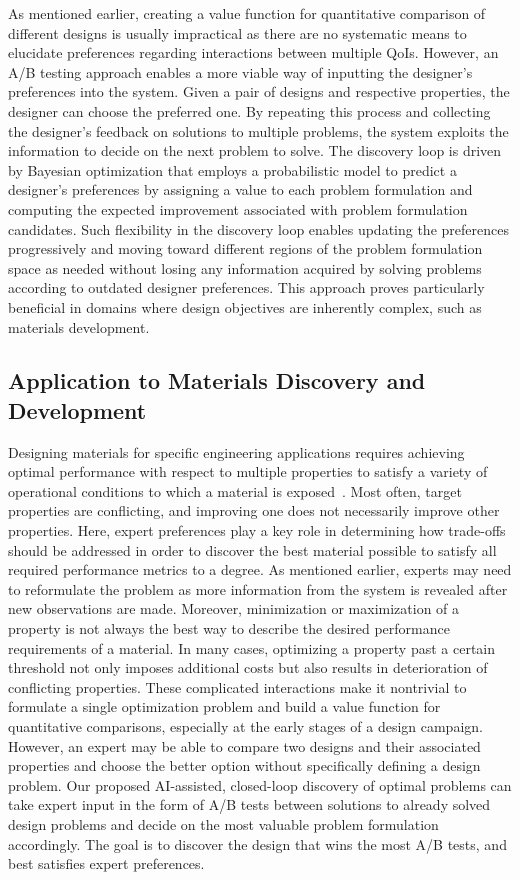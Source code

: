 \documentclass[final,5p,times,twocolumn]{elsarticle}
\begin{document}
As mentioned earlier, creating a value function for quantitative comparison of different designs is usually impractical as there are no systematic means to elucidate preferences regarding interactions between multiple QoIs. However, an A/B testing approach enables a more viable way of inputting the designer's preferences into the system. Given a pair of designs and respective properties, the designer can choose the preferred one. By repeating this process and collecting the designer's feedback on solutions to multiple problems, the system exploits the information to decide on the next problem to solve. The discovery loop is driven by Bayesian optimization that employs a probabilistic model to predict a designer's preferences by assigning a value to each problem formulation and computing the expected improvement associated with problem formulation candidates. Such flexibility in the discovery loop enables updating the preferences progressively and moving toward different regions of the problem formulation space as needed without losing any information acquired by solving problems according to outdated designer preferences. This approach proves particularly beneficial in domains where design objectives are inherently complex, such as materials development.



\subsection{Application to Materials Discovery and Development}


Designing materials for specific engineering applications requires achieving optimal performance with respect to multiple properties to satisfy a variety of operational conditions to which a material is exposed~\cite{Arroyave2022ADesign}. Most often, target properties are conflicting, and improving one does not necessarily improve other properties. Here, expert preferences play a key role in determining how trade-offs should be addressed in order to discover the best material possible to satisfy all required performance metrics to a degree. As mentioned earlier, experts may need to reformulate the problem as more information from the system is revealed after new observations are made. Moreover, minimization or maximization of a property is not always the best way to describe the desired performance requirements of a material. In many cases, optimizing a property past a certain threshold not only imposes additional costs but also results in deterioration of conflicting properties. These complicated interactions make it nontrivial to formulate a single optimization problem and build a value function for quantitative comparisons, especially at the early stages of a design campaign. However, an expert may be able to compare two designs and their associated properties and choose the better option without specifically defining a design problem. Our proposed AI-assisted, closed-loop discovery of optimal problems can take expert input in the form of A/B tests between solutions to already solved design problems and decide on the most valuable problem formulation accordingly. The goal is to discover the design that wins the most A/B tests, and best satisfies expert preferences.
\end{document}
